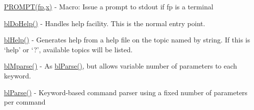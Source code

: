 \begin{DoxyItemize}
\item \hyperlink{macros_8h_acc487f163f8274ce4a0546d6d68eb035}{P\-R\-O\-M\-P\-T(fp,x)} -\/ Macro\-: Issue a prompt to stdout if fp is a terminal
\item \hyperlink{help_8c_ad508d3cae25ca4b71bc9f7a92daa97ee}{bl\-Do\-Help()} -\/ Handles help facility. This is the normal entry point.
\item \hyperlink{help_8c_a3ff43d9a155129038cde38442c4dee23}{bl\-Help()} -\/ Generates help from a help file on the topic named by string. If this is `help' or `?', available topics will be listed.
\item \hyperlink{parse_8c_afd91c119f7409f2c2f14151ca7bd6973}{bl\-Mparse()} -\/ As \hyperlink{parse_8c_ac9aa602f7562ba794b53e6ffbc75115c}{bl\-Parse()}, but allows variable number of parameters to each keyword.
\item \hyperlink{parse_8c_ac9aa602f7562ba794b53e6ffbc75115c}{bl\-Parse()} -\/ Keyword-\/based command parser using a fixed number of parameters per command 
\end{DoxyItemize}